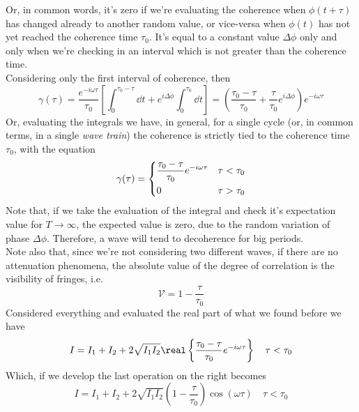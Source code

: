 \documentclass[../electromagnetism.tex]{subfiles}
\begin{document}
Or, in common words, it's zero if we're evaluating the coherence when $\phi(t+\tau)$ has changed already to another random value, or vice-versa when $\phi(t)$ has not yet reached the coherence time $\tau_0$. It's equal to a constant value $\Delta\phi$ only and only when we're checking in an interval which is not greater than the coherence time.\\
Considering only the first interval of coherence, then 
\begin{equation*}
	\gamma(\tau)=\frac{e^{-i\omega\tau}}{\tau_0}\left[ \int_{0}^{\tau_0-\tau}\dd^{}{t}+e^{i\Delta\phi}\int_{0}^{\tau_0}\dd^{}{t} \right]=\left( \frac{\tau_0-\tau}{\tau_0}+\frac{\tau}{\tau_0}e^{i\Delta\phi} \right)e^{-i\omega\tau}
\end{equation*}
Or, evaluating the integrals we have, in general, for a single cycle (or, in common terms, in a single \textit{wave train}) the coherence is strictly tied to the coherence time $\tau_0$, with the equation
\begin{equation}
	\gamma(\tau)=\begin{dcases}
		\frac{\tau_0-\tau}{\tau_0}e^{-i\omega\tau}&\tau<\tau_0\\
		0&\tau>\tau_0
	\end{dcases}
	\label{eq:correlationfuncwave.ctm}
\end{equation}
Note that, if we take the evaluation of the integral and check it's expectation value for $T\to\infty$, the expected value is zero, due to the random variation of phase $\Delta\phi$. Therefore, a wave will tend to decoherence for big periods.\\
Note also that, since we're not considering two different waves, if there are no attenuation phenomena, the absolute value of the degree of correlation is the visibility of fringes, i.e. 
\begin{equation}
	\mathcal{V}=1-\frac{\tau}{\tau_0}
	\label{eq:vis.ctm}
\end{equation}
Considered everything and evaluated the real part of what we found before we have
\begin{equation}
	I=I_1+I_2+2\sqrt{I_1I_2}\real\left\{ \frac{\tau_0-\tau}{\tau_0}e^{-i\omega\tau} \right\}\quad\tau<\tau_0
	\label{eq:intundertcoherence.ctm}
\end{equation}
Which, if we develop the last operation on the right becomes
\begin{equation}
	I=I_1+I_2+2\sqrt{I_1I_2}\left( 1-\frac{\tau}{\tau_0} \right)\cos(\omega\tau)\quad\tau<\tau_0
	\label{eq:intcoherencecomplete.ctm}
\end{equation}
\end{document}
